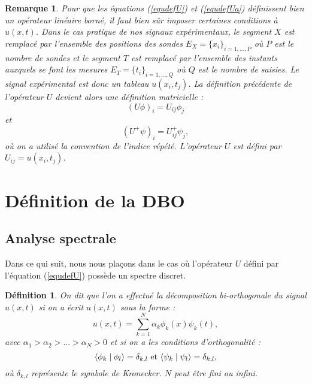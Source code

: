 \documentclass{book}
\newtheorem{defn}{D\'efinition}[chapter]
\newtheorem{rem}{Remarque}[chapter]
\begin{document}
\begin{rem}
Pour que les \'equations (\ref{equdefU}) et (\ref{equdefUa})
d\'efinissent bien un op\'erateur lin\'eaire born\'e, il faut bien
s\^ur imposer certaines conditions \`a $u(x,t)$.
Dans le cas pratique de nos signaux exp\'erimentaux,
le segment $X$ est remplac\'e par l'ensemble des positions des
sondes $E_X=\{x_i\}_{i=1,...,P}$ o\`u $P$ est le nombre de sondes
et le segment $T$ est remplac\'e par l'ensemble des instants
auxquels se font les mesures $E_T=\{t_i\}_{i=1,...,Q}$ o\`u $Q$
est le nombre de saisies.
Le signal exp\'erimental est donc un tableau
$u(x_i,t_j)$.
La d\'efinition pr\'ec\'edente de l'op\'erateur $U$ devient alors
une d\'efinition matricielle :
\begin{equation}
(U\phi)_i=U_{i j}\phi_j
\end{equation}
et
\begin{equation}
(U^+\psi)_i=U^+_{i j}\psi_j,
\end{equation}
o\`u on a utilis\'e la convention de l'indice r\'ep\'et\'e.
L'op\'erateur $U$ est d\'efini par $U_{i j}=u(x_i,t_j)$.

\end{rem}

\section{D\'efinition de la DBO}
\subsection{Analyse spectrale}
Dans ce qui suit, nous nous pla\c cons dans le cas o\`u l'op\'erateur
$U$ d\'efini par l'\'equation (\ref{equdefU}) poss\`ede un spectre
discret. 
\begin{defn}\label{defbod1}
On dit que l'on a effectu\'e la d\'ecomposition bi-orthogonale
du signal $u(x,t)$ si on a \'ecrit $u(x,t)$ sous la forme :
\begin{equation}\label{dec}
u(x,t)=\sum_{k=1}^{N}\alpha_k\phi_k(x)\psi_k(t),
\end{equation}
avec $\alpha_1>\alpha_2>...>\alpha_N>0$ et si on a les conditions
d'orthogonalit\'e :
\begin{equation}
\langle \phi_k\mid \phi_l\rangle =\delta_{k,l}\ {\rm et}\ \langle \psi_k\mid \psi_l\rangle =\delta_{k,l},
\end{equation}
o\`u $\delta_{k,l}$ repr\'esente le symbole de Kronecker. $N$ peut
\^etre fini ou infini.
\end{defn}
\end{document}
